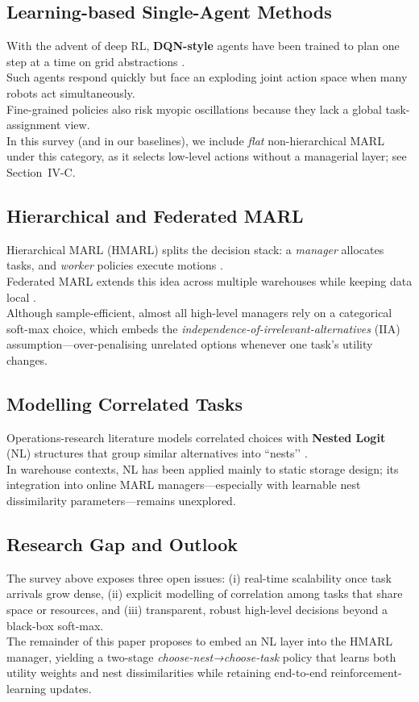 \documentclass[journal,onecolumn]{IEEEtran}
\begin{document}
\subsection{Learning-based Single-Agent Methods}
With the advent of deep RL, \textbf{DQN-style} agents have been trained to plan one step at a time on grid abstractions \citep{alam2024dqn}.  \\
Such agents respond quickly but face an exploding joint action space when many robots act simultaneously.  \\
Fine-grained policies also risk myopic oscillations because they lack a global task-assignment view.
\\
In this survey (and in our baselines), we include \emph{flat} non-hierarchical MARL under this category, as it selects low-level actions without a managerial layer; see Section~IV-C.

\subsection{Hierarchical and Federated MARL}
Hierarchical MARL (HMARL) splits the decision stack: a \emph{manager} allocates tasks, and \emph{worker} policies execute motions \citep{krnjaic2023hierarchical}.  \\
Federated MARL extends this idea across multiple warehouses while keeping data local \citep{ho2024federated}.  \\
Although sample-efficient, almost all high-level managers rely on a categorical soft-max choice, which embeds the \emph{independence-of-irrelevant-alternatives} (IIA) assumption—over-penalising unrelated options whenever one task’s utility changes.

\subsection{Modelling Correlated Tasks}
Operations-research literature models correlated choices with \textbf{Nested Logit} (NL) structures that group similar alternatives into “nests’’ \citep{train2009discrete}.  \\
In warehouse contexts, NL has been applied mainly to static storage design; its integration into online MARL managers—especially with learnable nest dissimilarity parameters—remains unexplored.

\FloatBarrier

\subsection{Research Gap and Outlook}
The survey above exposes three open issues: (i) real-time scalability once task arrivals grow dense, (ii) explicit modelling of correlation among tasks that share space or resources, and (iii) transparent, robust high-level decisions beyond a black-box soft-max.  \\
The remainder of this paper proposes to embed an NL layer into the HMARL manager, yielding a two-stage \textit{choose-nest→choose-task} policy that learns both utility weights and nest dissimilarities while retaining end-to-end reinforcement-learning updates.
\end{document}
